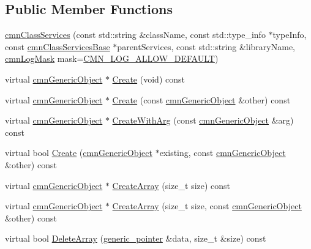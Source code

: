 \subsection*{Public Member Functions}
\begin{DoxyCompactItemize}
\item 
\hyperlink{classcmn_class_services_ae08bcbcf302b60b7303061f3a67c117c}{cmn\+Class\+Services} (const std\+::string \&class\+Name, const std\+::type\+\_\+info $\ast$type\+Info, const \hyperlink{classcmn_class_services_base}{cmn\+Class\+Services\+Base} $\ast$parent\+Services, const std\+::string \&library\+Name, \hyperlink{cmn_log_lo_d_8h_a44b6ef7560b0d204460b0a54f1a5d702}{cmn\+Log\+Mask} mask=\hyperlink{cmn_log_lo_d_8h_a941e5ff3075571f0ad1e53e1204bd856}{C\+M\+N\+\_\+\+L\+O\+G\+\_\+\+A\+L\+L\+O\+W\+\_\+\+D\+E\+F\+A\+U\+L\+T})
\item 
virtual \hyperlink{classcmn_generic_object}{cmn\+Generic\+Object} $\ast$ \hyperlink{classcmn_class_services_a2b565befb4c007fd0fce82cdc2fad865}{Create} (void) const 
\item 
virtual \hyperlink{classcmn_generic_object}{cmn\+Generic\+Object} $\ast$ \hyperlink{classcmn_class_services_a37572e1b161b28771f60d30cc72085d6}{Create} (const \hyperlink{classcmn_generic_object}{cmn\+Generic\+Object} \&other) const 
\item 
virtual \hyperlink{classcmn_generic_object}{cmn\+Generic\+Object} $\ast$ \hyperlink{classcmn_class_services_a1db1ba50cfbf06e482505b257dd90b20}{Create\+With\+Arg} (const \hyperlink{classcmn_generic_object}{cmn\+Generic\+Object} \&arg) const 
\item 
virtual bool \hyperlink{classcmn_class_services_a79461e9cafda8525bc80fc1daa29b8e8}{Create} (\hyperlink{classcmn_generic_object}{cmn\+Generic\+Object} $\ast$existing, const \hyperlink{classcmn_generic_object}{cmn\+Generic\+Object} \&other) const 
\item 
virtual \hyperlink{classcmn_generic_object}{cmn\+Generic\+Object} $\ast$ \hyperlink{classcmn_class_services_abb36ef4908f334060f17c54f4a9874be}{Create\+Array} (size\+\_\+t size) const 
\item 
virtual \hyperlink{classcmn_generic_object}{cmn\+Generic\+Object} $\ast$ \hyperlink{classcmn_class_services_aea137e364becad108d31b275287e3e96}{Create\+Array} (size\+\_\+t size, const \hyperlink{classcmn_generic_object}{cmn\+Generic\+Object} \&other) const 
\item 
virtual bool \hyperlink{classcmn_class_services_aaf95344fcb671aa86e401c7025bb7c6d}{Delete\+Array} (\hyperlink{classcmn_class_services_a350752158d6ffa3f741bcef03177f230}{generic\+\_\+pointer} \&data, size\+\_\+t \&size) const 

\end{DoxyCompactItemize}
